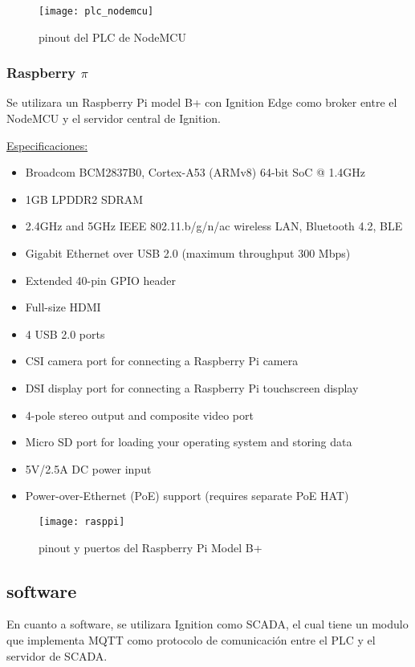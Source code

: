 \documentclass[12pt]{article}
\begin{document}
	\begin{figure}[h]
		\centering
		\caption{pinout del PLC de NodeMCU}
		\texttt{[image: plc\_nodemcu]}
	\end{figure}
	
	\subsubsection{Raspberry $\pi$}
	
	Se utilizara un Raspberry Pi model B+ con Ignition Edge como broker entre el NodeMCU y el servidor central de Ignition.
	
	\vspace{5mm}
	
	\underline{Especificaciones:}
	
	\begin{itemize}
		   \item Broadcom BCM2837B0, Cortex-A53 (ARMv8) 64-bit SoC @ 1.4GHz
		   \item 1GB LPDDR2 SDRAM
		   \item 2.4GHz and 5GHz IEEE 802.11.b/g/n/ac wireless LAN, Bluetooth 4.2, BLE
		   \item Gigabit Ethernet over USB 2.0 (maximum throughput 300 Mbps)
		   \item Extended 40-pin GPIO header
		   \item Full-size HDMI
		   \item 4 USB 2.0 ports
		   \item CSI camera port for connecting a Raspberry Pi camera
		   \item DSI display port for connecting a Raspberry Pi touchscreen display
		   \item 4-pole stereo output and composite video port
		   \item Micro SD port for loading your operating system and storing data
		   \item 5V/2.5A DC power input
		   \item Power-over-Ethernet (PoE) support (requires separate PoE HAT)
	\end{itemize}
	
	\begin{figure}[h]
		\centering
		\caption{pinout y puertos del Raspberry Pi Model B+}
		\texttt{[image: rasppi]}
	\end{figure}
	
	
	\subsection{software}
	En cuanto a software, se utilizara Ignition como SCADA, el cual tiene un modulo que implementa MQTT como protocolo de comunicación entre el PLC y el servidor de SCADA.
	
\end{document}
